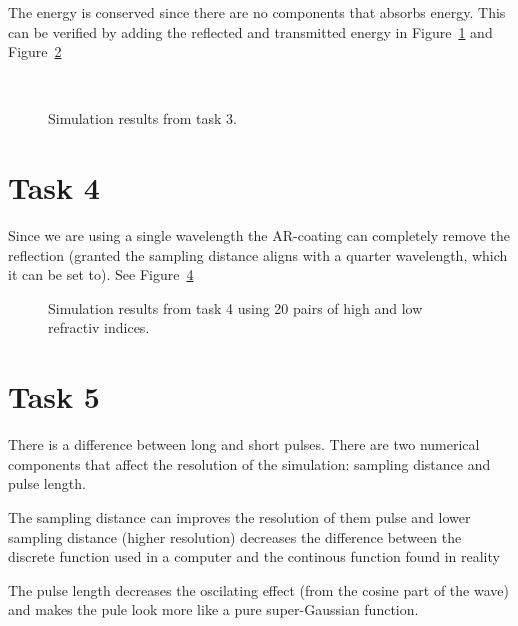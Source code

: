 \documentclass[12pt,a4paper]{article}
\begin{document}
The energy is conserved since there are no components that absorbs energy. This can be verified by adding the reflected and transmitted energy in Figure~\ref{fig:task3_1} and Figure~\ref{fig:task3_2}
\begin{figure}
  \centering
    \begin{subfigure}[b]{0.7\textwidth}
        \noindent\makebox[\textwidth]{\scalebox{0.7}{}}
        \label{fig:task3_1}
    \end{subfigure}\\
    \begin{subfigure}[b]{0.7\textwidth}
        \noindent\makebox[\textwidth]{\scalebox{0.7}{}}
        \label{fig:task3_2}
    \end{subfigure}
  \caption{Simulation results from task 3.}
  \label{fig:task3}
\end{figure}

\section{Task 4}\label{sec:4}
Since we are using a single wavelength the AR-coating can completely remove the reflection (granted the sampling distance aligns with a quarter wavelength, which it can be set to). See Figure~\ref{fig:task4}
\begin{figure}
  \centering
  \noindent\makebox[\textwidth]{\scalebox{0.90}{}}
  \caption{Simulation results from task 4 using 20 pairs of high and low refractiv indices.}
  \label{fig:task4}
\end{figure}

\section{Task 5}\label{sec:5}
There is a difference between long and short pulses. There are two numerical components that affect the resolution of the simulation: sampling distance and pulse length.

The sampling distance can improves the resolution of them pulse and lower sampling distance (higher resolution) decreases the difference between the discrete function used in a computer and the continous function found in reality

The pulse length decreases the oscilating effect (from the cosine part of the wave) and makes the pule look more like a pure super-Gaussian function.
\end{document}
